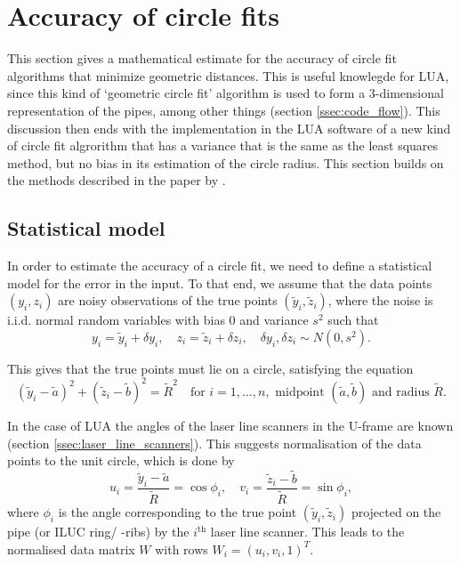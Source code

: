 \section{Accuracy of circle fits} \label{sec:accuracy}
This section gives a mathematical estimate for the accuracy of circle fit algorithms that minimize geometric distances. This is useful knowlegde for LUA, since this kind of `geometric circle fit' algorithm is used to form a 3-dimensional representation of the pipes, among other things (section \ref{ssec:code_flow}). This discussion then ends with the implementation in the LUA software of a new kind of circle fit algrorithm that has a variance that is the same as the least squares method, but no bias in its estimation of the circle radius. This section builds on the methods described in the paper by \citeauthor{alsharadqah_chernov_circle_fitting} \cite{alsharadqah_chernov_circle_fitting}.

\subsection{Statistical model}\label{ssec:statistical_model}
In order to estimate the accuracy of a circle fit, we need to define a statistical model for the error in the input. To that end, we assume that the data points $(y_i, z_i)$ are noisy observations of the true points $(\tilde{y}_i, \tilde{z}_i)$, where the noise is i.i.d. normal random variables with bias 0 and variance $s^2$ \cite[section 2]{alsharadqah_chernov_circle_fitting} such that
\begin{equation}
    y_i = \tilde{y}_i + \delta y_i, \quad z_i = \tilde{z}_i + \delta z_i, \quad \delta y_i, \delta z_i \sim N(0, s^2).
\end{equation}

This gives that the true points must lie on a circle, satisfying the equation
\begin{equation}
    (\tilde{y}_i - \tilde{a})^2 + (\tilde{z}_i - \tilde{b})^2 = \tilde{R}^2 \quad \text{for } i = 1, \dots, n, \text{ midpoint } (\tilde{a}, \tilde{b}) \text{ and radius } \tilde{R}.
\end{equation}

In the case of LUA the angles of the laser line scanners in the U-frame are known (section \ref{ssec:laser_line_scanners}). This suggests normalisation of the data points to the unit circle, which is done by
\begin{equation}
    u_i = \frac{\tilde{y}_i - \tilde{a}}{\tilde{R}} = \cos{\phi_i}, \quad v_i = \frac{\tilde{z}_i - \tilde{b}}{\tilde{R}} = \sin{\phi_i},
\end{equation}
where $\phi_i$ is the angle corresponding to the true point $(\tilde{y}_i, \tilde{z}_i)$ projected on the pipe (or ILUC ring/ -ribs) by the $i^{\text{th}}$ laser line scanner. This leads to the normalised data matrix $W$ with rows $W_i = (u_i, v_i, 1)^T$.

